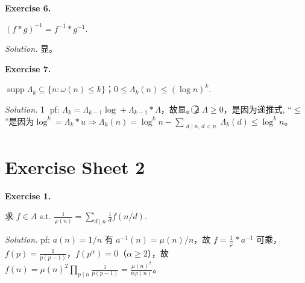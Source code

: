 \documentclass[
	colors = true,
	geometry = b5,
	fontsetup = font-setup-overleaf.tex,
	titlesetup = titles-setup.tex
]{AJbook}
\newenvironment{sheetexercise}[1]{%
	\par\medskip
	\noindent\textbf{Exercise #1.}\enspace
}{%
	\par\smallskip
}
\newenvironment{solution}{%
	\par\smallskip
	\noindent\textit{Solution.}\enspace
}{%
	\par\smallskip
}
\begin{document}
\begin{sheetexercise}{6}
$(f*g)^{-1}=f^{-1}*g^{-1}$.
\end{sheetexercise}
\begin{solution}显。\end{solution}

\begin{sheetexercise}{7}
$\operatorname{supp}\Lambda_k\subseteq\{n:\omega(n)\leq k\}$；$0\leq\Lambda_k(n)\leq(\log n)^k$.
\end{sheetexercise}
\begin{solution}\textcircled{\scriptsize 1} pf: $\Lambda_k=\Lambda_{k-1}\log+\Lambda_{k-1}*\Lambda$，故显。\textcircled{\scriptsize 2} $\Lambda\geq0$，是因为递推式, “$\leq$”是因为$\log^k=\Lambda_k*u\Rightarrow \Lambda_k(n)=\log^k n-\sum_{\substack{d\mid n, \, d<n}}\Lambda_k(d)\leq\log^k n$。\end{solution}
\chapter{Exercise Sheet 2}
\begin{sheetexercise}{1}
求 $f\in A$ s.t. $\frac1{\varphi(n)}=\sum_{d\mid n}\frac1d f(n/d)$.
\end{sheetexercise}
\begin{solution}pf: $a(n)=1/n$ 有 $a^{-1}(n)=\mu(n)/n$，故 $f=\frac1\varphi*a^{-1}$ 可乘，$f(p)=\frac1{p(p-1)}$，$f(p^\alpha)=0$（$\alpha\geq2$），故 $f(n)=\mu(n)^2\prod_{p\mid n}\frac1{p(p-1)}=\frac{\mu(n)^2}{n\varphi(n)}$。\end{solution}
\end{document}
